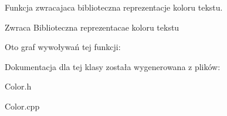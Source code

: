 Funkcja zwracajaca biblioteczna reprezentacje koloru tekstu. 

\begin{DoxyReturn}{Zwraca}
Biblioteczna reprezentacae koloru tekstu 
\end{DoxyReturn}


Oto graf wywoływań tej funkcji\+:




Dokumentacja dla tej klasy została wygenerowana z plików\+:\begin{DoxyCompactItemize}
\item 
Color.\+h\item 
Color.\+cpp\end{DoxyCompactItemize}

